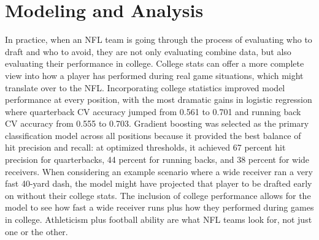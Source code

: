 \documentclass[11pt]{article}
\begin{document}

\section{Modeling and Analysis}

In practice, when an NFL team is going through the process of evaluating who to draft and who to avoid, they are not only evaluating combine data, but also evaluating their performance in college. College stats can offer a more complete view into how a player has performed during real game situations, which might translate over to the NFL. Incorporating college statistics improved model performance at every position, with the most dramatic gains in logistic regression where quarterback CV accuracy jumped from 0.561 to 0.701 and running back CV accuracy from 0.555 to 0.703. Gradient boosting was selected as the primary classification model across all positions because it provided the best balance of hit precision and recall: at optimized thresholds, it achieved 67 percent hit precision for quarterbacks, 44 percent for running backs, and 38 percent for wide receivers. When considering an example scenario where a wide receiver ran a very fast 40-yard dash, the model might have projected that player to be drafted early on without their college stats. The inclusion of college performance allows for the model to see how fast a wide receiver runs plus how they performed during games in college. Athleticism plus football ability are what NFL teams look for, not just one or the other.
\\
\\
\end{document}
